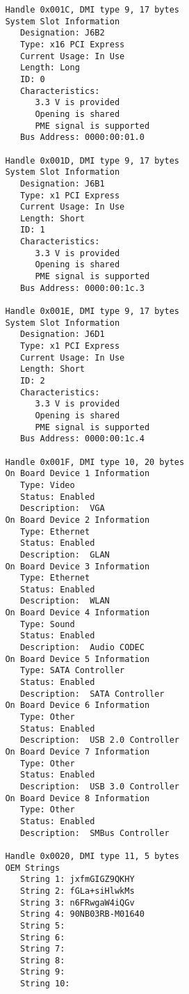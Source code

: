 \documentclass[11pt]{article}
\begin{document}
\begin{tiny}
\begin{verbatim}
         Handle 0x001C, DMI type 9, 17 bytes
         System Slot Information
            Designation: J6B2
            Type: x16 PCI Express
            Current Usage: In Use
            Length: Long
            ID: 0
            Characteristics:
               3.3 V is provided
               Opening is shared
               PME signal is supported
            Bus Address: 0000:00:01.0
         
         Handle 0x001D, DMI type 9, 17 bytes
         System Slot Information
            Designation: J6B1
            Type: x1 PCI Express
            Current Usage: In Use
            Length: Short
            ID: 1
            Characteristics:
               3.3 V is provided
               Opening is shared
               PME signal is supported
            Bus Address: 0000:00:1c.3
         
         Handle 0x001E, DMI type 9, 17 bytes
         System Slot Information
            Designation: J6D1
            Type: x1 PCI Express
            Current Usage: In Use
            Length: Short
            ID: 2
            Characteristics:
               3.3 V is provided
               Opening is shared
               PME signal is supported
            Bus Address: 0000:00:1c.4
         
         Handle 0x001F, DMI type 10, 20 bytes
         On Board Device 1 Information
            Type: Video
            Status: Enabled
            Description:  VGA
         On Board Device 2 Information
            Type: Ethernet
            Status: Enabled
            Description:  GLAN
         On Board Device 3 Information
            Type: Ethernet
            Status: Enabled
            Description:  WLAN
         On Board Device 4 Information
            Type: Sound
            Status: Enabled
            Description:  Audio CODEC 
         On Board Device 5 Information
            Type: SATA Controller
            Status: Enabled
            Description:  SATA Controller
         On Board Device 6 Information
            Type: Other
            Status: Enabled
            Description:  USB 2.0 Controller
         On Board Device 7 Information
            Type: Other
            Status: Enabled
            Description:  USB 3.0 Controller
         On Board Device 8 Information
            Type: Other
            Status: Enabled
            Description:  SMBus Controller
         
         Handle 0x0020, DMI type 11, 5 bytes
         OEM Strings
            String 1: jxfmGIGZ9QKHY
            String 2: fGLa+siHlwkMs
            String 3: n6FRwgaW4iQGv
            String 4: 90NB03RB-M01640
            String 5:  
            String 6:  
            String 7:  
            String 8:  
            String 9:  
            String 10:  
         

\end{verbatim}
\end{tiny}
\end{document}
